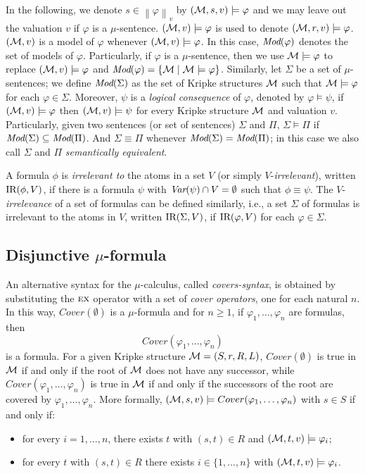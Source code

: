 \documentclass[runningheads]{llncs}
\begin{document}
In the following, we denote $s\in \left\| \varphi \right\|_v$ by $({\cal M}, s, v) \models \varphi$ and we may leave out the
valuation $v$ if $\varphi$ is a $\mu$-sentence.
$({\cal M}, v) \models \varphi$ is used to denote $({\cal M}, r, v) \models \varphi$.
$({\cal M},v)$ is a model of $\varphi$ whenever  $({\cal M}, v) \models \varphi$.
In this case, $\textit{Mod}(\varphi)$ denotes the set of models of $\varphi$.
Particularly, if $\varphi$ is a $\mu$-sentence, then we use ${\cal M} \models \varphi$ to replace $({\cal M}, v) \models \varphi$ and $\textit{Mod}(\varphi) = \{{\cal M} \mid {\cal M} \models \varphi\}$.
Similarly, let $\Sigma$ be a set of $\mu$-sentences; we define $\textit{Mod}(\Sigma)$ as the set of Kripke structures ${\cal M}$ such that ${\cal M} \models \varphi$ for each $\varphi\in \Sigma$.
Moreover, $\psi$ is a \emph{logical consequence} of $\varphi$, denoted by $\varphi \models \psi$, if $({\cal M},v ) \models \varphi$ then $({\cal M},v) \models \psi$ for every Kripke structure ${\cal M}$ and valuation $v$.
Particularly, given two sentences (or set of sentences) $\Sigma$ and $\Pi$, $\Sigma \models \Pi$ if $\textit{Mod}(\Sigma) \subseteq \textit{Mod}(\Pi)$. And $\Sigma \equiv \Pi$ whenever $\textit{Mod}(\Sigma) = \textit{Mod}(\Pi)$; in this case we also call $\Sigma$ and $\Pi$ \emph{semantically  equivalent}.

A formula $\phi$ is {\em irrelevant to} the atoms in a set $V$ (or simply $V$-{\em irrelevant}), written $\textrm{IR}(\phi,V)$,
if there is a formula $\psi$ with $\textit{Var}(\psi)\cap V=\emptyset$ such that $\phi\equiv\psi$.
The $V$-{\em irrelevance} of a set of formulas can be defined similarly, i.e., a set $\Sigma$ of formulas is irrelevant to the atoms in $V$, written $\textrm{IR}(\Sigma, V)$, if $\textrm{IR}(\varphi, V)$ for each $\varphi \in \Sigma$.


\subsection{Disjunctive $\mu$-formula}
An alternative syntax for the $\mu$-calculus, called \emph{covers-syntax}, is obtained by substituting the $\textsc{e}\textsc{x}$ operator with a set of \emph{cover operators}, one for each natural $n$.
In this way, $Cover(\emptyset)$ is a $\mu$-formula and for $n \geq 1$, if $\varphi_1, \dots, \varphi_n$ are formulas, then
\[
Cover(\varphi_1, \dots, \varphi_n)
\]
is a formula. For a given Kripke structure ${\cal M} = (S,r,R,L)$, $Cover(\emptyset)$ is true in ${\cal M}$ if and only if the root of ${\cal M}$ does not have any successor, while $Cover(\varphi_1, \dots, \varphi_n)$ is true in ${\cal M}$ if and only if the successors
of the root are covered by $\varphi_1, \dots, \varphi_n$. More formally, $({\cal M}, s,v ) \models Cover(\varphi_1, \dots, \varphi_n)$ with $s \in S$
if and only if:
\begin{itemize}
	\item for every $i = 1, . . . , n$, there exists $t$ with $(s, t) \in R$ and $({\cal M}, t,v) \models \varphi_i$;
	\item for every $t$ with $(s, t) \in R$ there exists $i\in \{1, . . . , n\}$ with $({\cal M}, t,v) \models \varphi_i$.
\end{itemize}
\end{document}
